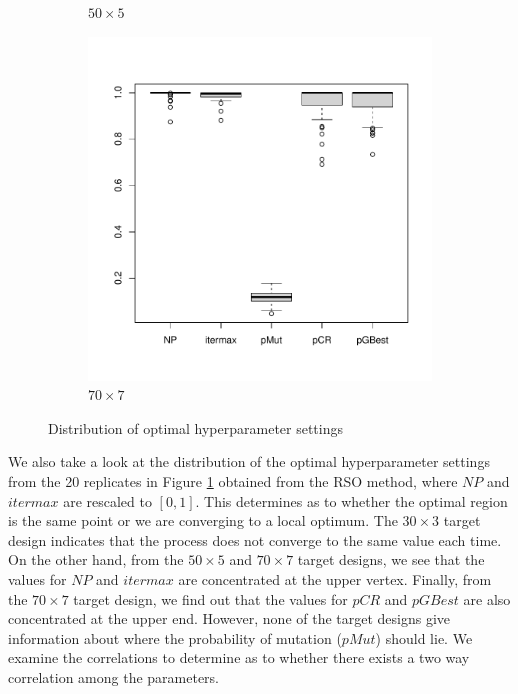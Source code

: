 \documentclass [PhD] {package/uclathes}
\begin{document}
\begin{figure}
\begin{subfigure}[b]{0.3\textwidth}
\caption{$50\times 5$}
\end{subfigure}
\begin{subfigure}[b]{0.3\textwidth}
\centering
\includegraphics{chapters/RSO/pdfs/corplot70}
\caption{$70\times 7$}
\end{subfigure}
\caption{Distribution of optimal hyperparameter settings}
\label{fig:optimalpoints}
\end{figure}

We also take a look at the distribution of the optimal hyperparameter settings from the 20 replicates in Figure \ref{fig:optimalpoints} obtained from the RSO method, where $NP$ and $itermax$ are rescaled to $[0, 1]$. This determines as to whether the optimal region is the same point or we are converging to a local optimum.
The $30 \times 3$ target design indicates that the process does not converge to the same value each time. On the other hand, from the $50 \times 5$ and $70 \times 7$ target designs, we see that the  values for $NP$ and $itermax$  are concentrated at the upper vertex. Finally, from the $70 \times 7$ target design, we find out that the values for $pCR$ and $pGBest$  are also  concentrated at the upper end. However, none of the target designs give information about where the probability of mutation ($pMut$) should lie.
We examine the correlations to determine as to whether there exists a two way correlation among the parameters.
\end{document}
